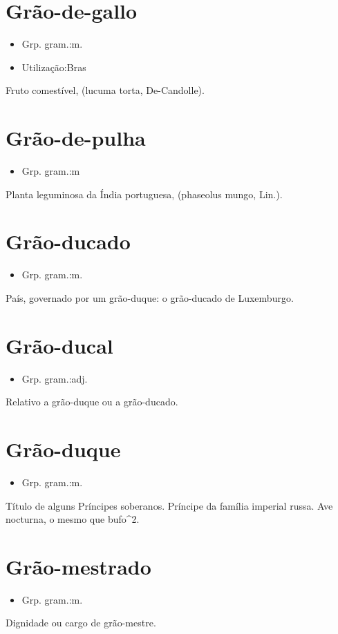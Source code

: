 \section{Grão-de-gallo}
\begin{itemize}
\item {Grp. gram.:m.}
\end{itemize}
\begin{itemize}
\item {Utilização:Bras}
\end{itemize}
Fruto comestível, (\textunderscore lucuma torta\textunderscore , De-Candolle).
\section{Grão-de-pulha}
\begin{itemize}
\item {Grp. gram.:m}
\end{itemize}
Planta leguminosa da Índia portuguesa, (\textunderscore phaseolus mungo\textunderscore , Lin.).
\section{Grão-ducado}
\begin{itemize}
\item {Grp. gram.:m.}
\end{itemize}
País, governado por um grão-duque: \textunderscore o grão-ducado de Luxemburgo\textunderscore .
\section{Grão-ducal}
\begin{itemize}
\item {Grp. gram.:adj.}
\end{itemize}
Relativo a grão-duque ou a grão-ducado.
\section{Grão-duque}
\begin{itemize}
\item {Grp. gram.:m.}
\end{itemize}
Título de alguns Príncipes soberanos.
Príncipe da família imperial russa.
Ave nocturna, o mesmo que \textunderscore bufo\textunderscore ^2.
\section{Grão-mestrado}
\begin{itemize}
\item {Grp. gram.:m.}
\end{itemize}
Dignidade ou cargo de grão-mestre.
